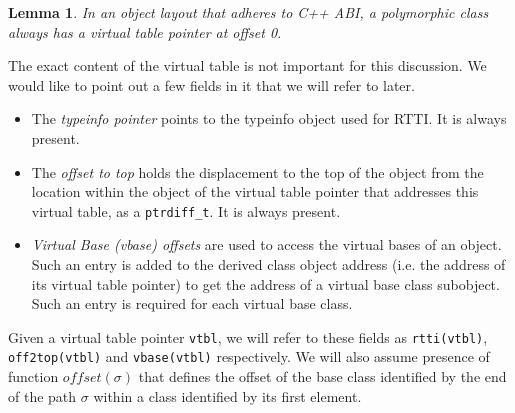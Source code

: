 \documentclass[preprint]{sigplanconf}
\makeatletter
\DeclareRobustCommand{\code}[1]{{\lstinline[breaklines=false,escapechar=@]{#1}}}
\newtheorem{lemma}{Lemma}
\makeatother
\begin{document}
\begin{lemma}
In an object layout that adheres to C++ ABI, a polymorphic class always has a 
virtual table pointer at offset 0.
\label{lem:vtbl}
\end{lemma}



\noindent
The exact content of the virtual table is not important for this discussion. We 
would like to point out a few fields in it that we will refer to later.

\begin{itemize}
\setlength{\itemsep}{0pt}
\setlength{\parskip}{0pt}
\item The \emph{typeinfo pointer} points to the typeinfo object used for RTTI. 
      It is always present.  
\item The \emph{offset to top} holds the displacement to the top of the object 
      from the location within the object of the virtual table pointer that 
      addresses this virtual table, as a \code{ptrdiff_t}. It is always present.
\item \emph{Virtual Base (vbase) offsets} are used to access the virtual bases 
      of an object. Such an entry is added to the derived class object address 
      (i.e. the address of its virtual table pointer) to get the address of a 
      virtual base class subobject. Such an entry is required for each virtual 
      base class.
\end{itemize}

\noindent
Given a virtual table pointer \code{vtbl}, we will refer to these fields as 
\code{rtti(vtbl)}, \code{off2top(vtbl)} and \code{vbase(vtbl)} respectively. 
We will also assume presence of function $offset(\sigma)$ that defines the 
offset of the base class identified by the end of the path $\sigma$ within a 
class identified by its first element.
\end{document}
